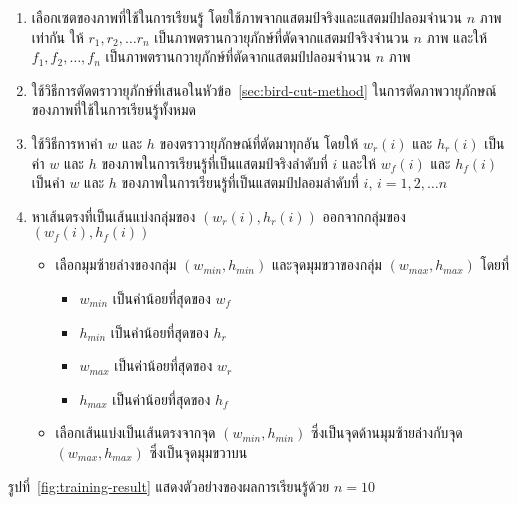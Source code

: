 \begin{enumerate}
\item เลือกเซตของภาพที่ใช้ในการเรียนรู้  โดยใช้ภาพจากแสตมป์จริงและแสตมป์ปลอมจำนวน $n$ ภาพเท่ากัน   ให้ $r_1, r_2,\ldots r_n$ เป็นภาพตรานกวายุภักษ์ที่ตัดจากแสตมป์จริงจำนวน $n$ ภาพ และให้ $f_1, f_2,\ldots , f_n$ เป็นภาพตรานกวายุภักษ์ที่ตัดจากแสตมป์ปลอมจำนวน $n$ ภาพ
\item ใช้วิธีการตัดตราวายุภักษ์ที่เสนอในหัวข้อ~\ref{sec:bird-cut-method}  ในการตัดภาพวายุภักษณ์ของภาพที่ใช้ในการเรียนรู้ทั้งหมด
\item ใช้วิธีการหาค่า $w$ และ $h$ ของตราวายุภักษณ์ที่ตัดมาทุกอัน โดยให้ $w_r(i)$ และ $h_r(i)$ เป็นค่า $w$ และ $h$ ของภาพในการเรียนรู้ที่เป็นแสตมป์จริงลำดับที่ $i$ และให้ $w_f(i)$ และ $h_f(i)$ เป็นค่า $w$ และ $h$ ของภาพในการเรียนรู้ที่เป็นแสตมป์ปลอมลำดับที่ $i$, $i = 1, 2,\ldots n$
\item หาเส้นตรงที่เป็นเส้นแบ่งกลุ่มของ $(w_r(i), h_r(i))$ ออกจากกลุ่มของ $(w_f(i), h_f(i))$ 
\begin{itemize}
\item เลือกมุมซ้ายล่างของกลุ่ม $(w_{min}, h_{min})$ และจุดมุมขวาของกลุ่ม $(w_{max}, h_{max})$ โดยที่
\begin{itemize}
\item $w_{min}$ เป็นค่าน้อยที่สุดของ   $w_f$ 
\item $h_{min}$ เป็นค่าน้อยที่สุดของ $h_r$ 
\item $w_{max}$ เป็นค่าน้อยที่สุดของ   $w_r$ 
\item $h_{max}$ เป็นค่าน้อยที่สุดของ $h_f$ 
\end{itemize}
\item เลือกเส้นแบ่งเป็นเส้นตรงจากจุด $(w_{min},h_{min})$ ซึ่งเป็นจุดด้านมุมซ้ายล่างกับจุด $(w_{max}, h_{max})$ ซึ่งเป็นจุดมุมขวาบน
\end{itemize}
\end{enumerate}
 
 รูปที่~\ref{fig:training-result} แสดงตัวอย่างของผลการเรียนรู้ด้วย $n=10$



